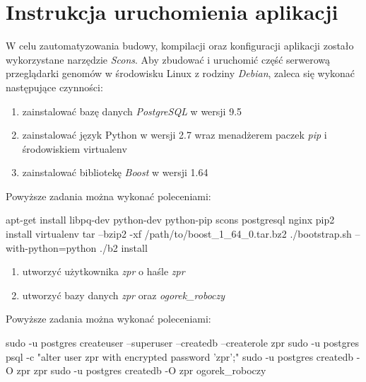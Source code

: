 \section{Instrukcja uruchomienia aplikacji}
W celu zautomatyzowania budowy, kompilacji oraz konfiguracji aplikacji zostało wykorzystane narzędzie \textit{Scons}.
Aby zbudować i uruchomić część serwerową przeglądarki genomów w środowisku Linux z rodziny \textit{Debian}, zaleca się wykonać następujące czynności:
\begin{enumerate}
	\item zainstalować bazę danych \textit{PostgreSQL} w wersji 9.5
	\item zainstalować język Python w wersji 2.7 wraz menadżerem paczek \textit{pip} i środowiskiem virtualenv
	\item zainstalować bibliotekę \textit{Boost} w wersji 1.64
\end{enumerate}
Powyższe zadania można wykonać poleceniami:

\begin{spverbatim}
	apt-get install libpq-dev python-dev python-pip scons postgresql nginx
	pip2 install virtualenv
	tar --bzip2 -xf /path/to/boost_1_64_0.tar.bz2 ./bootstrap.sh --with-python=python ./b2 install
\end{spverbatim}

\begin{enumerate}[resume]
	\item utworzyć użytkownika \textit{zpr} o haśle \textit{zpr}
	\item utworzyć bazy danych \textit{zpr} oraz \textit{ogorek\_roboczy}
\end{enumerate}
Powyższe zadania można wykonać poleceniami:

\begin{spverbatim}
	sudo -u postgres createuser --superuser --createdb --createrole zpr 
	sudo -u postgres psql -c "alter user zpr with encrypted password 'zpr';"
	sudo -u postgres createdb -O zpr zpr 
	sudo -u postgres createdb -O zpr ogorek_roboczy
\end{spverbatim}

